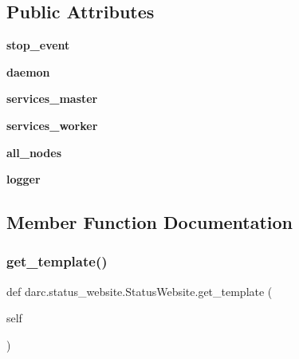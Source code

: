\subsection*{Public Attributes}
\begin{DoxyCompactItemize}
\item 
\mbox{\label{classdarc_1_1status__website_1_1_status_website_a86bd0d1ff6b95e75b6d166e754f8109c}} 
{\bfseries stop\+\_\+event}
\item 
\mbox{\label{classdarc_1_1status__website_1_1_status_website_aef7b452904e4f36f97ad175a569b2401}} 
{\bfseries daemon}
\item 
\mbox{\label{classdarc_1_1status__website_1_1_status_website_acb3530136dcb0303736001c9db8a47ae}} 
{\bfseries services\+\_\+master}
\item 
\mbox{\label{classdarc_1_1status__website_1_1_status_website_a97ff874a8a9f4ff14c0a4557bf232ba0}} 
{\bfseries services\+\_\+worker}
\item 
\mbox{\label{classdarc_1_1status__website_1_1_status_website_a2e6440da6710ff6f9f47578b85ee20cb}} 
{\bfseries all\+\_\+nodes}
\item 
\mbox{\label{classdarc_1_1status__website_1_1_status_website_aa52a53e655c05d6c50688014a66b9906}} 
{\bfseries logger}
\end{DoxyCompactItemize}


\subsection{Member Function Documentation}
\mbox{\label{classdarc_1_1status__website_1_1_status_website_a763be37122d5e36e243ed5b3b4a245ab}} 
\subsubsection{\texorpdfstring{get\_template()}{get\_template()}}
{\footnotesize\ttfamily def darc.\+status\+\_\+website.\+Status\+Website.\+get\+\_\+template (\begin{DoxyParamCaption}\item[{}]{self }\end{DoxyParamCaption})}


